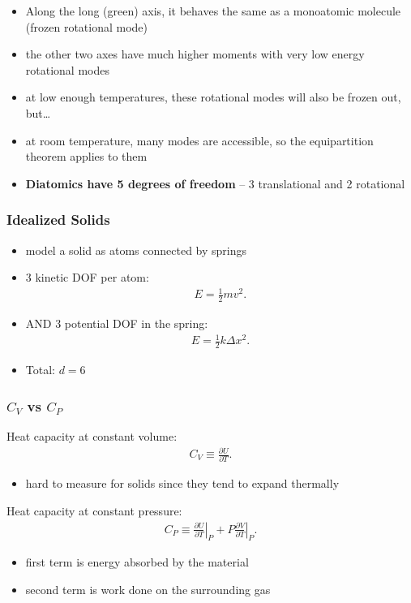 \documentclass[10pt]{article}
\begin{document}
\begin{itemize}
\begin{itemize}
        \item Along the long (green) axis, it behaves the same as a monoatomic molecule (frozen rotational mode)
        \item the other two axes have much higher moments with very low energy rotational modes
        \item at low enough temperatures, these rotational modes will also be frozen out, but\ldots
        \item at room temperature, many modes are accessible, so the equipartition theorem applies to them
        \item \textbf{Diatomics have 5 degrees of freedom}  -- 3 translational and 2 rotational
    \end{itemize}
\end{itemize}

\subsubsection{Idealized Solids}
\begin{itemize}
    \item model a solid as atoms connected by springs
    \item 3 kinetic DOF per atom:
        \begin{align*}
            E = \frac{1}{2}mv^2
        .\end{align*}
    \item AND 3 potential DOF in the spring:
        \begin{align*}
            E = \frac{1}{2}k\Delta x^2
        .\end{align*}
    \item Total: $d = 6$
\end{itemize}
\subsubsection{$C_V$ vs  $C_P$}
Heat capacity at constant volume:
\begin{align*}
    C_V \equiv \frac{\partial U}{\partial T} 
.\end{align*}
\begin{itemize}
    \item hard to measure for solids since they tend to expand thermally
\end{itemize}
Heat capacity at constant pressure:
\begin{gather*}
    C_P \equiv \left. \frac{\partial U}{\partial T} \right|_P + P \left. \frac{\partial V}{\partial T} \right|_P
.\end{gather*}
\begin{itemize}
    \item first term is energy absorbed by the material
    \item second term is work done on the surrounding gas
\end{itemize}
\end{document}
